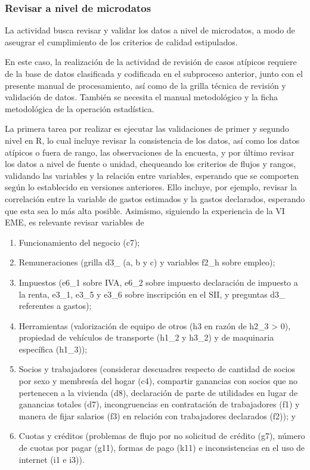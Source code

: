 \documentclass[
]{article}
\providecommand{\tightlist}{%
  \setlength{\itemsep}{0pt}\setlength{\parskip}{0pt}}
\begin{document}
\hypertarget{revisar-a-nivel-de-microdatos}{%
\subsubsection{Revisar a nivel de microdatos}\label{revisar-a-nivel-de-microdatos}}

La actividad busca revisar y validar los datos a nivel de microdatos, a modo de aseugrar el cumplimiento de los criterios de calidad estipulados.

En este caso, la realización de la actividad de revisión de casos atípicos requiere de la base de datos clasificada y codificada en el subproceso anterior, junto con el presente manual de procesamiento, así como de la grilla técnica de revisión y validación de datos. También se necesita el manual metodológico y la ficha metodológica de la operación estadística.

La primera tarea por realizar es ejecutar las validaciones de primer y segundo nivel en R, lo cual incluye revisar la consistencia de los datos, así como los datos atípicos o fuera de rango, las observaciones de la encuesta, y por último revisar los datos a nivel de fuente o unidad, chequeando los criterios de flujos y rangos, validando las variables y la relación entre variables, esperando que se comporten según lo establecido en versiones anteriores. Ello incluye, por ejemplo, revisar la correlación entre la variable de gastos estimados y la gastos declarados, esperando que esta sea lo más alta posible. Asimismo, siguiendo la experiencia de la VI EME, es relevante revisar variables de

\begin{enumerate}
\def\labelenumi{\alph{enumi})}
\tightlist
\item
  Funcionamiento del negocio (c7);
\item
  Remuneraciones (grilla d3\_ (a, b y c) y variables f2\_h sobre empleo);
\item
  Impuestos (e6\_1 sobre IVA, e6\_2 sobre impuesto declaración de impuesto a la renta, e3\_1, e3\_5 y e3\_6 sobre inscripción en el SII, y preguntas d3\_ referentes a gastos);
\item
  Herramientas (valorización de equipo de otros (h3 en razón de h2\_3 \textgreater{} 0), propiedad de vehículos de transporte (h1\_2 y h3\_2) y de maquinaria específica (h1\_3));
\item
  Socios y trabajadores (considerar descuadres respecto de cantidad de socios por sexo y membresía del hogar (c4), compartir ganancias con socios que no pertenecen a la vivienda (d8), declaración de parte de utilidades en lugar de ganancias totales (d7), incongruencias en contratación de trabajadores (f1) y manera de fijar salarios (f3) en relación con trabajadores declarados (f2)); y
\item
  Cuotas y créditos (problemas de flujo por no solicitud de crédito (g7), número de cuotas por pagar (g11), formas de pago (k11) e inconsistencias en el uso de internet (i1 e i3)).
\end{enumerate}
\end{document}
